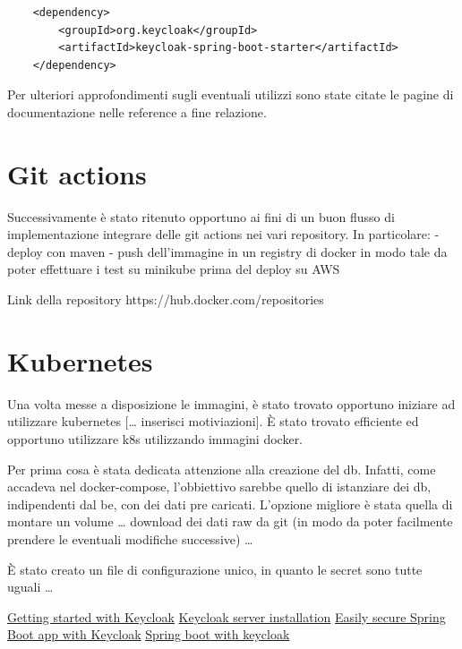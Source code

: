 \documentclass{article}
\begin{document}
\begin{verbatim}
    <dependency>
        <groupId>org.keycloak</groupId>
        <artifactId>keycloak-spring-boot-starter</artifactId>
    </dependency>
\end{verbatim}

Per ulteriori approfondimenti sugli eventuali utilizzi sono state citate le pagine di documentazione nelle reference a fine relazione.

\pagebreak

\section{Git actions}

Successivamente è stato ritenuto opportuno ai fini di un buon flusso di implementazione integrare delle git actions nei vari repository. In particolare:
	- deploy con maven
	- push dell’immagine in un registry di docker in modo tale da poter effettuare i test su minikube prima del deploy su AWS

Link della repository https://hub.docker.com/repositories

\section{Kubernetes}

Una volta messe a disposizione le immagini, è stato trovato opportuno iniziare ad utilizzare kubernetes [… inserisci motiviazioni]. È stato trovato efficiente ed opportuno utilizzare k8s utilizzando immagini docker.


Per prima cosa è stata dedicata attenzione alla creazione del db. Infatti, come accadeva nel docker-compose, l’obbiettivo sarebbe quello di istanziare dei db, indipendenti dal be, con dei dati pre caricati. L’opzione migliore è stata quella di montare un volume … download dei dati raw da git (in modo da poter facilmente prendere le eventuali modifiche successive) …

È stato creato un file di configurazione unico, in quanto le secret sono tutte uguali …


\begin{thebibliography}{4}

     \href{https://www.keycloak.org/docs/11.0/getting_started/}{Getting started with Keycloak}
     \href{https://www.keycloak.org/docs/latest/server_installation/}{Keycloak server installation}
     \href{https://www.keycloak.org/2017/05/easily-secure-your-spring-boot.html}{Easily secure Spring Boot app with Keycloak}
     \href{https://www.baeldung.com/spring-boot-keycloak}{Spring boot with keycloak}

\end{thebibliography}
\end{document}

